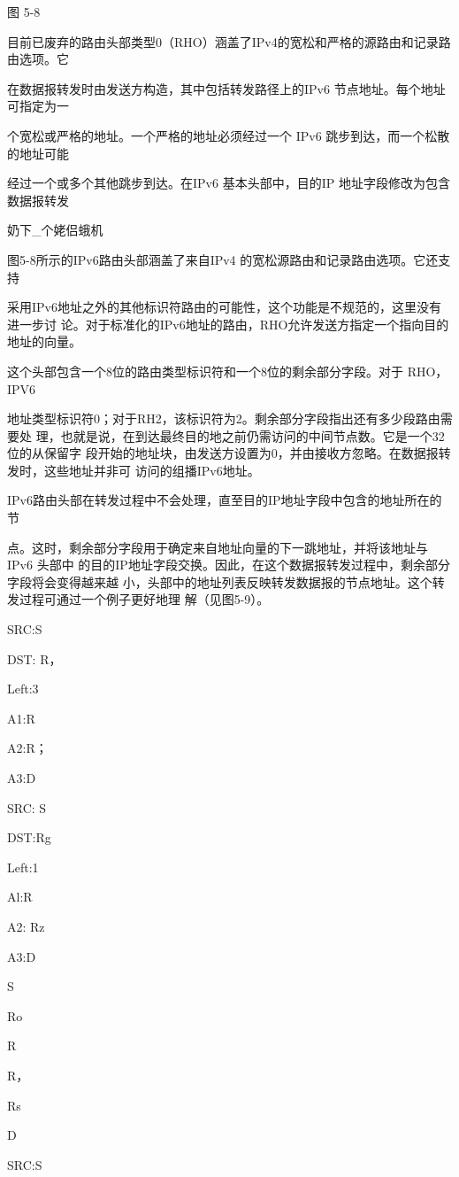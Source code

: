 图 5-8

目前已废弃的路由头部类型0（RHO）涵盖了IPv4的宽松和严格的源路由和记录路由选项。它

在数据报转发时由发送方构造，其中包括转发路径上的IPv6 节点地址。每个地址可指定为一

个宽松或严格的地址。一个严格的地址必须经过一个 IPv6 跳步到达，而一个松散的地址可能

经过一个或多个其他跳步到达。在IPv6 基本头部中，目的IP 地址字段修改为包含数据报转发

奶下\_个姥侣蛾机

图5-8所示的IPv6路由头部涵盖了来自IPv4 的宽松源路由和记录路由选项。它还支持

采用IPv6地址之外的其他标识符路由的可能性，这个功能是不规范的，这里没有进一步讨
论。对于标准化的IPv6地址的路由，RHO允许发送方指定一个指向目的地址的向量。

这个头部包含一个8位的路由类型标识符和一个8位的剩余部分字段。对于 RHO，IPV6

地址类型标识符0；对于RH2，该标识符为2。剩余部分字段指出还有多少段路由需要处
理，也就是说，在到达最终目的地之前仍需访问的中间节点数。它是一个32位的从保留字
段开始的地址块，由发送方设置为0，并由接收方忽略。在数据报转发时，这些地址并非可
访问的组播IPv6地址。

IPv6路由头部在转发过程中不会处理，直至目的IP地址字段中包含的地址所在的节

点。这时，剩余部分字段用于确定来自地址向量的下一跳地址，并将该地址与IPv6 头部中
的目的IP地址字段交换。因此，在这个数据报转发过程中，剩余部分字段将会变得越来越
小，头部中的地址列表反映转发数据报的节点地址。这个转发过程可通过一个例子更好地理
解（见图5-9）。

SRC:S

DST: R，

Left:3

A1:R

A2:R；

A3:D

SRC: S

DST:Rg

Left:1

Al:R

A2: Rz

A3:D

S

Ro

R

R，

Rs

D

SRC:S

